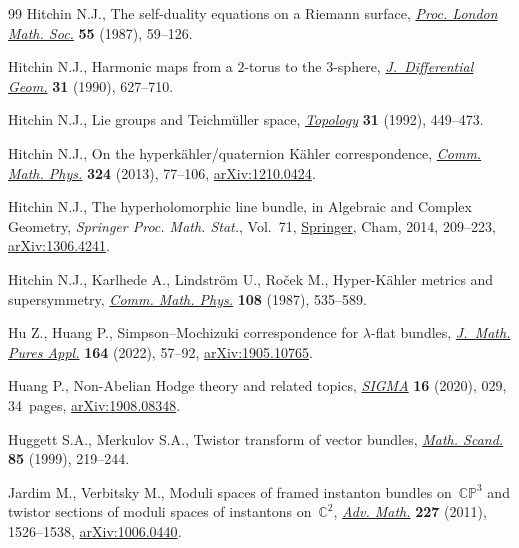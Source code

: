 \documentclass[pdftex]{sigma}
\numberwithin{equation}{section}
\theoremstyle{definition}
\begin{document}
\begin{thebibliography}{99}
Hitchin N.J., The self-duality equations on a {R}iemann surface,
 \href{https://doi.org/10.1112/plms/s3-55.1.59}{\textit{Proc. London Math.
 Soc.}} \textbf{55} (1987), 59--126.

Hitchin N.J., Harmonic maps from a {$2$}-torus to the {$3$}-sphere,
 \href{https://doi.org/10.4310/jdg/1214444631}{\textit{J.~Differential Geom.}}
 \textbf{31} (1990), 627--710.

Hitchin N.J., Lie groups and {T}eichm\"uller space,
 \href{https://doi.org/10.1016/0040-9383(92)90044-I}{\textit{Topology}}
 \textbf{31} (1992), 449--473.

Hitchin N.J., On the hyperk\"ahler/quaternion {K}\"ahler correspondence,
 \href{https://doi.org/10.1007/s00220-013-1689-y}{\textit{Comm. Math. Phys.}}
 \textbf{324} (2013), 77--106,
 \href{http://arxiv.org/abs/1210.0424}{arXiv:1210.0424}.

Hitchin N.J., The hyperholomorphic line bundle, in Algebraic and {C}omplex
 {G}eometry, \textit{Springer Proc. Math. Stat.}, Vol.~71,
 \href{https://doi.org/10.1007/978-3-319-05404-9_8}{Springer}, Cham, 2014,
 209--223, \href{http://arxiv.org/abs/1306.4241}{arXiv:1306.4241}.

Hitchin N.J., Karlhede A., Lindstr\"om U., Ro\v{c}ek M., Hyper-{K}\"ahler
 metrics and supersymmetry,
 \href{https://doi.org/10.1007/BF01214418}{\textit{Comm. Math. Phys.}}
 \textbf{108} (1987), 535--589.

Hu Z., Huang P., Simpson--{M}ochizuki correspondence for {$\lambda$}-flat
 bundles, \href{https://doi.org/10.1016/j.matpur.2022.06.002}{\textit{J.~Math.
 Pures Appl.}} \textbf{164} (2022), 57--92,
 \href{http://arxiv.org/abs/1905.10765}{arXiv:1905.10765}.

Huang P., Non-{A}belian {H}odge theory and related topics,
 \href{https://doi.org/10.3842/SIGMA.2020.029}{\textit{SIGMA}} \textbf{16}
 (2020), 029, 34~pages,
 \href{http://arxiv.org/abs/1908.08348}{arXiv:1908.08348}.

Huggett S.A., Merkulov S.A., Twistor transform of vector bundles,
 \href{https://doi.org/10.7146/math.scand.a-18273}{\textit{Math. Scand.}}
 \textbf{85} (1999), 219--244.

Jardim M., Verbitsky M., Moduli spaces of framed instanton bundles
 on~{$\mathbb{CP}^3$} and twistor sections of moduli spaces of instantons
 on~{$\mathbb C^2$},
 \href{https://doi.org/10.1016/j.aim.2011.03.012}{\textit{Adv. Math.}}
 \textbf{227} (2011), 1526--1538,
 \href{http://arxiv.org/abs/1006.0440}{arXiv:1006.0440}.


\end{thebibliography}
\end{document}
